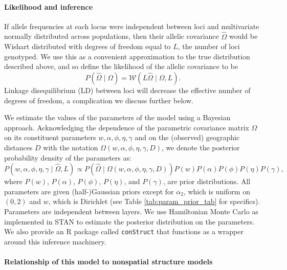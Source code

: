\documentclass[12pt]{article}
\begin{document}
\paragraph{Likelihood and inference}
If allele frequencies at each locus
were independent between loci and multivariate normally distributed across populations, 
then their allelic covariance $\widehat{\Omega}$ 
would be Wishart distributed with degrees of freedom equal to $L$, 
the number of loci genotyped.
We use this as a convenient approximation to the true distribution described above,
and so define the likelihood of the allelic covariance to be
\begin{equation}
P(\widehat{\Omega} \; | \; \Omega) = \mathcal{W} \left( L\widehat{\Omega} \; | \; \Omega,L\right) .
\end{equation}
Linkage disequilibrium (LD) between loci will decrease the effective number of degrees of freedom, 
a complication we discuss further below.

We estimate the values of the parameters of the model using a Bayesian approach.
Acknowledging the dependence of the parametric covariance matrix $\Omega$ on its constituent parameters
$w,\alpha,\phi,\eta,\gamma$ and on the (observed) geographic distances $D$ 
with the notation $\Omega(w,\alpha,\phi,\eta,\gamma,D)$,
we denote the posterior probability density of the parameters as:
\begin{equation}
P\left( w,\alpha,\phi,\eta,\gamma \;	| \; \widehat{\Omega}, L \right) \propto
P\left(\widehat{\Omega} \; | \; \Omega(w,\alpha,\phi,\eta,\gamma,D) \right)
P(w)P(\alpha)P(\phi)P(\eta)P(\gamma) ,
\end{equation}
where $P(w)$, $P(\alpha)$, $P(\phi)$, $P(\eta)$, and $P(\gamma)$, are prior distributions.
All parameters are given (half-)Gaussian priors except for $\alpha_2$, which is uniform on $(0,2)$ and $w$, which is Dirichlet
(see Table \ref{tab:param_prior_tab} for specifics).
Parameters are independent between layers.
We use Hamiltonian Monte Carlo as implemented in STAN \citep{stan, NUTS, stan_lib, rstan} 
to estimate the posterior distribution on the parameters.
We also provide an R package \citep{R} called \texttt{conStruct} that functions as a wrapper 
around this inference machinery.


\paragraph{Relationship of this model to nonspatial structure models}
\end{document}
